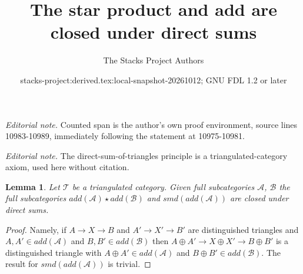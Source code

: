 \documentclass{stacks-project}
\title{The star product and add are closed under direct sums}
\author{The Stacks Project Authors}
\date{stacks-project:derived.tex:local-snapshot-20261012; GNU FDL 1.2 or later}
\theoremstyle{plain}
\newtheorem{lemma}[subsection]{Lemma}
\theoremstyle{definition}
\theoremstyle{remark}
\numberwithin{equation}{subsection}
\begin{document}
\maketitle
\noindent\textit{Editorial note.} Counted span is the author's own proof environment, source lines 10983-10989, immediately following the statement at 10975-10981.\par\medskip
\noindent\textit{Editorial note.} The direct-sum-of-triangles principle is a triangulated-category axiom, used here without citation.\par\medskip
\begin{lemma}
\label{lemma-add-star}
Let $\mathcal{T}$ be a triangulated category. Given full subcategories
$\mathcal{A}$, $\mathcal{B}$ the full subcategories
$add(\mathcal{A}) \star add(\mathcal{B})$ and
$smd(add(\mathcal{A}))$ are closed under direct sums.
\end{lemma}

\begin{proof}
Namely, if $A \to X \to B$ and $A' \to X' \to B'$ are distinguished triangles
and $A, A' \in add(\mathcal{A})$ and $B, B' \in add(\mathcal{B})$ then
$A \oplus A' \to X \oplus X' \to B \oplus B'$ is a distinguished triangle
with $A \oplus A' \in add(\mathcal{A})$ and $B \oplus B' \in add(\mathcal{B})$.
The result for $smd(add(\mathcal{A}))$ is trivial.
\end{proof}
\end{document}
